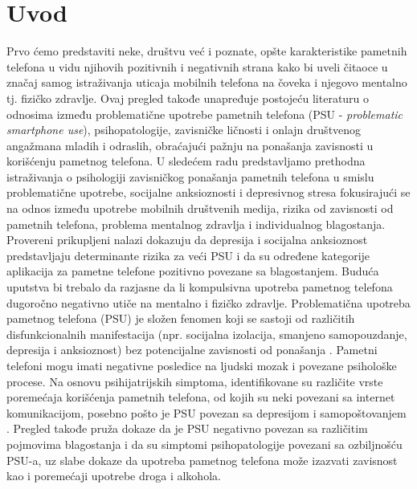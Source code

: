 \documentclass[a4paper]{article}
\begin{document}
\section{Uvod}
Prvo ćemo predstaviti neke, društvu već i poznate, opšte 
karakteristike pametnih telefona u vidu njihovih pozitivnih i negativnih strana
kako bi uveli čitaoce u značaj samog istraživanja uticaja mobilnih telefona
na čoveka i njegovo mentalno tj. fizičko zdravlje.
\newline
Ovaj pregled takođe unapređuje postojeću literaturu o odnosima između
problematične upotrebe pametnih telefona (PSU - \textit{problematic smartphone use}), 
psihopatologije, zavisničke ličnosti i onlajn društvenog angažmana mladih i odraslih, 
obraćajući pažnju na ponašanja zavisnosti u korišćenju pametnog telefona.
\newline
\newline
U sledećem radu predstavljamo prethodna istraživanja o psihologiji zavisničkog
ponašanja pametnih telefona u smislu problematične upotrebe,
socijalne anksioznosti i depresivnog stresa fokusirajući se na odnos između
upotrebe mobilnih društvenih medija, rizika od zavisnosti od pametnih telefona,
problema mentalnog zdravlja i individualnog blagostanja.
Provereni prikupljeni nalazi dokazuju da depresija i socijalna anksioznost
predstavljaju determinante rizika za veći PSU i da su određene kategorije
aplikacija za pametne telefone pozitivno povezane sa blagostanjem.
\newline
\newline
Buduća uputstva bi trebalo da razjasne da li
kompulsivna upotreba pametnog telefona dugoročno negativno utiče na mentalno
i fizičko zdravlje.
\newline
\newline
Problematična upotreba pametnog telefona (PSU) je složen
fenomen koji se sastoji od različitih disfunkcionalnih
manifestacija (npr. socijalna izolacija, smanjeno samopouzdanje,
depresija i anksioznost) bez potencijalne zavisnosti od ponašanja \cite{phone}.
Pametni telefoni mogu imati negativne posledice na ljudski mozak i povezane
psihološke procese.
Na osnovu psihijatrijskih simptoma, identifikovane su različite
vrste poremećaja korišćenja pametnih telefona, od kojih su neki povezani
sa internet komunikacijom, posebno pošto je PSU povezan sa depresijom
i samopoštovanjem \cite{miss}.
\newline
Pregled takođe pruža dokaze da je PSU negativno povezan sa različitim
pojmovima blagostanja i da su simptomi psihopatologije povezani sa
ozbiljnošću PSU-a, uz slabe dokaze da upotreba pametnog
telefona može izazvati zavisnost kao i poremećaji upotrebe droga i alkohola.
\end{document}
